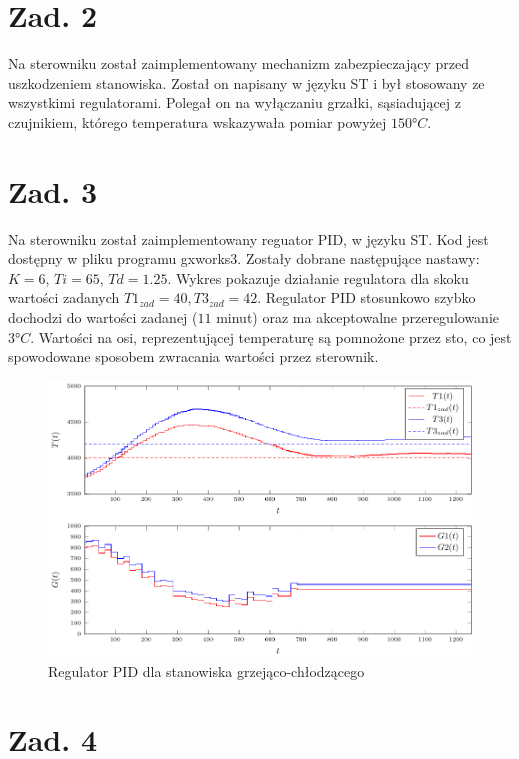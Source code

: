 \documentclass[a4paper,titlepage,11pt,twosides,floatssmall]{mwrep}
\begin{document}
\chapter{Zad. 2}
Na sterowniku został zaimplementowany mechanizm zabezpieczający przed uszkodzeniem stanowiska. Został on napisany w języku ST i był stosowany ze wszystkimi regulatorami. Polegał on na wyłączaniu grzałki, sąsiadującej z czujnikiem, którego temperatura wskazywała pomiar powyżej $ \ang{150}C $.


\endgroup

\chapter{Zad. 3}

Na sterowniku został zaimplementowany reguator PID, w języku ST. Kod jest dostępny w pliku programu gxworks3. Zostały dobrane następujące nastawy: $K = 6$, $Ti = 65$, $Td = 1.25$. Wykres pokazuje działanie regulatora dla skoku wartości zadanych $T1_{zad} = 40, T3_{zad} = 42$. Regulator PID stosunkowo szybko dochodzi do wartości zadanej ($11$ minut) oraz ma akceptowalne przeregulowanie $ \ang{3}C $. Wartości na osi, reprezentującej temperaturę są pomnożone przez sto, co jest spowodowane sposobem zwracania wartości przez sterownik.

\begin{figure}[]
	\centering
	\includegraphics[scale=1]{../wykresy/zad3_pid.pdf}
	\caption{Regulator PID dla stanowiska grzejąco-chłodzącego}
	\label{zad3_pid}
\end{figure}

\chapter{Zad. 4}
\end{document}
